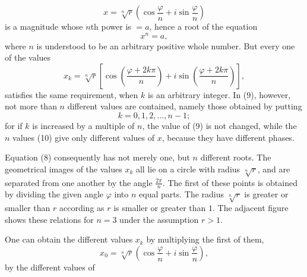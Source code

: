 
\begin{equation}
 x=\sqrt[n]{r}\left(\cos\frac{\varphi}{n}+i\sin\frac{\varphi}{n}\right)
\tag{7}
\end{equation}
is a magnitude whose $n$th power is $=a$, hence a root of the equation
\begin{equation}
 x^n=a,
\tag{8}
\end{equation}
where $n$ is understood to be an arbitrary positive whole number. But every one of the values
\begin{equation}
 x_k=\sqrt[n]{r}\left[\cos\left(\frac{\varphi+2k\pi}{n}\right)+i\sin\left(\frac{\varphi+2k\pi}{n}\right)\right],
\tag{9}
\end{equation}
satisfies the same requirement, when $k$ is an arbitrary integer. In (9), however, not more than $n$ different values are contained, namely those obtained by putting
\begin{equation}
 k=0,1,2,\ldots,n-1;
\tag{10}
\end{equation}
for if $k$ is increased by a multiple of $n$, the value of (9) is not changed, while the $n$ values (10) give only different values of $x$, because they have different phases.

Equation (8) consequently has not merely one, but $n$ different roots. The geometrical images of the values $x_k$ all lie on a circle with radius $\sqrt[n]{r}$, and are separated from one another by the angle $\frac{2\pi}{n}$. The first of these points is obtained by dividing the given angle $\varphi$ into $n$ equal parts. The radius $\sqrt[n]{r}$ is greater or smaller than $r$ according as $r$ is smaller or greater than $1$. The adjacent figure shows these relations for $n=3$ under the assumption $r>1$.




One can obtain the different values $x_k$ by multiplying the first of them,
\[
 x_0=\sqrt[n]{r}\left(\cos\frac{\varphi}{n}+i\sin\frac{\varphi}{n}\right),
\]
by the different values of
